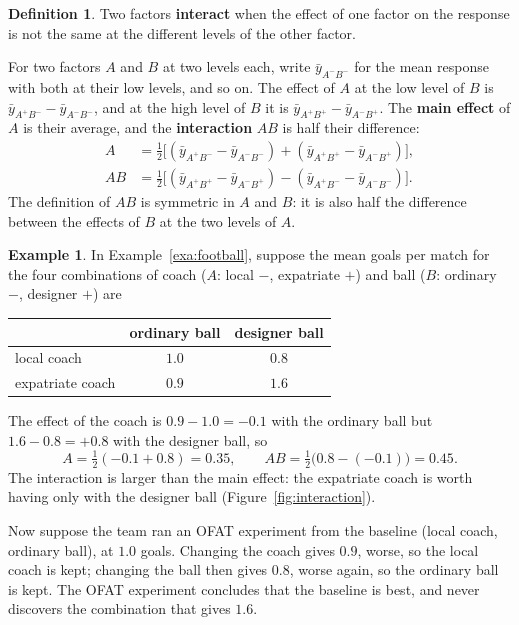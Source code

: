 \documentclass[11pt,a4paper]{article}
\numberwithin{equation}{section}
\theoremstyle{definition}
\newtheorem{defn}[thm]{Definition}
\newtheorem{exa}[thm]{Example}
\begin{document}
\begin{defn}
Two factors \textbf{interact} when the effect of one factor on the response is not the same at the different levels of the other factor.
\end{defn}

For two factors $A$ and $B$ at two levels each, write $\bar y_{A^-B^-}$ for the mean response with both at their low levels, and so on. The effect
of $A$ at the low level of $B$ is $\bar y_{A^+B^-} - \bar y_{A^-B^-}$, and at the high level of $B$ it is $\bar y_{A^+B^+} - \bar y_{A^-B^+}$. The \textbf{main effect} of $A$
is their average, and the \textbf{interaction} $AB$ is half their difference:
\begin{align*}
A &= \tfrac12\bigl[(\bar y_{A^+B^-} - \bar y_{A^-B^-}) + (\bar y_{A^+B^+} - \bar y_{A^-B^+})\bigr] , \\
AB &= \tfrac12\bigl[(\bar y_{A^+B^+} - \bar y_{A^-B^+}) - (\bar y_{A^+B^-} - \bar y_{A^-B^-})\bigr] .
\end{align*}
The definition of $AB$ is symmetric in $A$ and $B$: it is also half the difference between the effects of $B$ at the two levels of $A$.

\begin{exa}\label{exa:coach-ball}
In Example~\ref{exa:football}, suppose the mean goals per match for the four combinations of coach ($A$: local $-$, expatriate $+$) and ball
($B$: ordinary $-$, designer $+$) are
\begin{center}
\begin{tabular}{l|cc}
 & ordinary ball & designer ball \\
\hline
local coach & $1.0$ & $0.8$ \\
expatriate coach & $0.9$ & $1.6$
\end{tabular}
\end{center}
The effect of the coach is $0.9 - 1.0 = -0.1$ with the ordinary ball but $1.6 - 0.8 = +0.8$ with the designer ball, so
\[
A = \tfrac12(-0.1 + 0.8) = 0.35 , \qquad AB = \tfrac12\bigl(0.8 - (-0.1)\bigr) = 0.45 .
\]
The interaction is larger than the main effect: the expatriate coach is worth having only with the designer ball (Figure~\ref{fig:interaction}).

Now suppose the team ran an OFAT experiment from the baseline (local coach, ordinary ball), at $1.0$ goals. Changing the coach gives $0.9$, worse, so
the local coach is kept; changing the ball then gives $0.8$, worse again, so the ordinary ball is kept. The OFAT experiment concludes that the
baseline is best, and never discovers the combination that gives $1.6$.
\end{exa}
\end{document}
